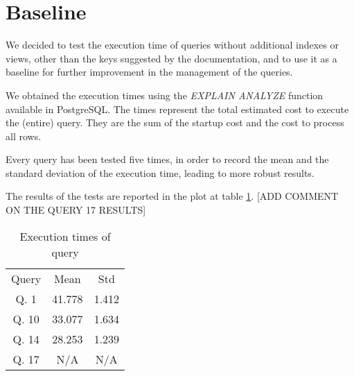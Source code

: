 \section{Baseline}

We decided to test the execution time of queries without additional indexes or views, other than the keys suggested by the documentation, and to use it as a baseline for further improvement in the management of the queries.

We obtained the execution times using the \emph{EXPLAIN ANALYZE} function available in PostgreSQL. The times represent the total estimated cost to execute the (entire) query. They are the sum of the startup cost and the cost to process all rows.

Every query has been tested five times, in order to record the mean and the standard deviation of the execution time, leading to more robust results.

The results of the tests are reported in the plot at table \ref{tab:baseline_exec_time}.
[ADD COMMENT ON THE QUERY 17 RESULTS]

\begin{table}[H]
\centering 
\begin{tabular}{c|c|c} 
\rowcolor{blue!50} Query & Mean & Std\\ 
\rowcolor{gray!10} Q. 1 &41.778 &1.412\\
\rowcolor{white} Q. 10 &33.077 &1.634\\
\rowcolor{gray!10} Q. 14 &28.253 &1.239\\
\rowcolor{white} Q. 17 &N/A &N/A \\
\end{tabular}\\[0.5cm] 
\caption{Execution times of query} 
\label{tab:baseline_exec_time} 
\end{table}

